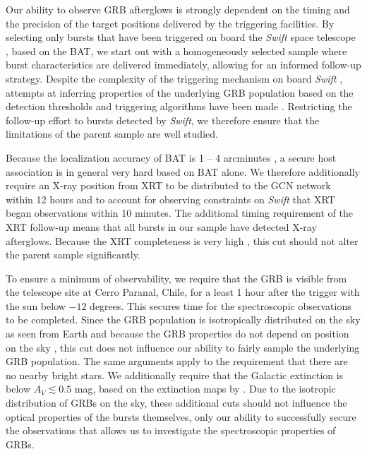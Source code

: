\documentclass{aa}    %
\begin{document}
Our ability to observe GRB afterglows is strongly dependent on the timing and
the precision of the target positions delivered by the triggering facilities. By
selecting only bursts that have been triggered on board the \textit{Swift} space
telescope \citep{Gehrels2004}, based on the BAT, we  start out with a homogeneously selected sample where
burst characteristics are delivered immediately, allowing for an informed
follow-up strategy. Despite the complexity of the triggering mechanism on board
\textit{Swift} \citep{Band2006, Coward2013a}, attempts at inferring properties
of the underlying GRB population based on the detection thresholds and
triggering algorithms have been made \citep{Lien2014, Graff2016}. Restricting
the follow-up effort to bursts detected by \textit{Swift}, we therefore ensure
that the limitations of the parent sample are well studied.

Because the localization accuracy of BAT is 1 -- 4 arcminutes
\citep{Barthelmy2005}, a secure host association is in general very hard based
on BAT alone. We therefore additionally require an X-ray position from XRT to be
distributed to the GCN network \citep{Barthelmy2000} within 12 hours and to
account for observing constraints on \textit{Swift} that XRT began observations
within 10 minutes. The additional timing requirement of the XRT follow-up means
that all bursts in our sample have detected X-ray afterglows. Because the XRT
completeness is very high \citep{Burrows2007}, this cut should not alter the
parent sample significantly.

To ensure a minimum of observability, we require that the GRB is visible from
the telescope site at Cerro Paranal, Chile, for a least 1 hour after the trigger
with the sun below $-12$ degrees. This secures time for the spectroscopic
observations to be completed. Since the GRB population is isotropically
distributed on the sky as seen from Earth and because the GRB properties do not
depend on position on the sky \citep{Meegan1992, Briggs1996, Ukwatta2016}, this
cut does not influence our ability to fairly sample the underlying GRB
population. The same arguments apply to the requirement that there are no nearby
bright stars. We additionally require that the Galactic extinction is below $A_V
\lesssim 0.5$ mag, based on the extinction maps by \citet{Schlegel1998,
	Schlafly2011}. Due to the isotropic distribution of GRBs on the sky, these
additional cuts should not influence the optical properties of the bursts
themselves, only our ability to successfully secure the observations that allows
us to investigate the spectroscopic properties of GRBs.
\end{document}
